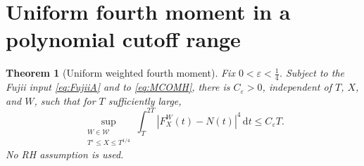 \documentclass[11pt,a4paper]{article}
\numberwithin{equation}{section}
\newtheorem{theorem}{Theorem}[section]
\theoremstyle{definition}
\theoremstyle{remark}
\newcommand{\dd}{\,\mathrm dt}
\begin{document}
\section{Uniform fourth moment in a polynomial cutoff range}\label{sec:moderate}
\begin{theorem}[Uniform weighted fourth moment]\label{thm:moderate}
Fix $0<\varepsilon<\frac14$. Subject to the Fujii input \eqref{eq:FujiiA} and to \eqref{eq:MCOMH}, there is $C_\varepsilon>0$, independent of $T$, $X$, and $W$, such that for $T$ sufficiently large,
\begin{equation}\label{eq:moderate}
\boxed{\displaystyle
\sup_{\substack{W\in\mathcal W\\ T^\varepsilon\le X\le T^{1/4}}}
\int_T^{2T}|F_X^W(t)-N(t)|^4\dd\le C_\varepsilon T.}
\end{equation}
No RH assumption is used.
\end{theorem}
\end{document}
